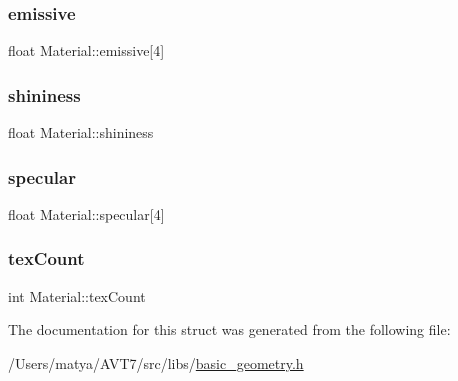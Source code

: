 \mbox{\label{struct_material_a374ee687979c26f4a9e3d671d89a9751}} 
\subsubsection{\texorpdfstring{emissive}{emissive}}
{\footnotesize\ttfamily float Material\+::emissive\mbox{[}4\mbox{]}}

\mbox{\label{struct_material_a9dc184c883ec135ace28c1917af3fe84}} 
\subsubsection{\texorpdfstring{shininess}{shininess}}
{\footnotesize\ttfamily float Material\+::shininess}

\mbox{\label{struct_material_a570719a080c2168e8c0225c085472c64}} 
\subsubsection{\texorpdfstring{specular}{specular}}
{\footnotesize\ttfamily float Material\+::specular\mbox{[}4\mbox{]}}

\mbox{\label{struct_material_ad0964c5d437284a4dc9cfbe6e6dcafcc}} 
\subsubsection{\texorpdfstring{tex\+Count}{texcount}}
{\footnotesize\ttfamily int Material\+::tex\+Count}



The documentation for this struct was generated from the following file\+:\begin{DoxyCompactItemize}
\item 
/\+Users/matya/\+A\+V\+T7/src/libs/\hyperlink{basic__geometry_8h}{basic\+\_\+geometry.\+h}\end{DoxyCompactItemize}
